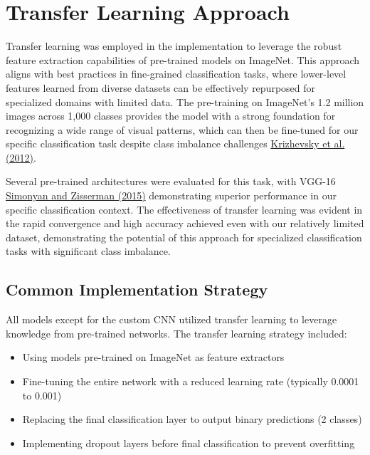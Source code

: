 \documentclass[a4paper,12pt]{article}
\begin{document}
\section{Transfer Learning Approach}

Transfer learning was employed in the implementation to leverage the robust feature extraction capabilities of pre-trained models on ImageNet. This approach aligns with best practices in fine-grained classification tasks, where lower-level features learned from diverse datasets can be effectively repurposed for specialized domains with limited data. The pre-training on ImageNet's 1.2 million images across 1,000 classes provides the model with a strong foundation for recognizing a wide range of visual patterns, which can then be fine-tuned for our specific classification task despite class imbalance challenges \href{https://proceedings.neurips.cc/paper/2012/file/c399862d3b9d6b76c8436e924a68c45b-Paper.pdf}{Krizhevsky et al. (2012)}.

Several pre-trained architectures were evaluated for this task, with VGG-16 \href{https://arxiv.org/abs/1409.1556}{Simonyan and Zisserman (2015)} demonstrating superior performance in our specific classification context. The effectiveness of transfer learning was evident in the rapid convergence and high accuracy achieved even with our relatively limited dataset, demonstrating the potential of this approach for specialized classification tasks with significant class imbalance.

\subsection{Common Implementation Strategy}

All models except for the custom CNN utilized transfer learning to leverage knowledge from pre-trained networks. The transfer learning strategy included:

\begin{itemize}
    \item Using models pre-trained on ImageNet as feature extractors
    \item Fine-tuning the entire network with a reduced learning rate (typically 0.0001 to 0.001)
    \item Replacing the final classification layer to output binary predictions (2 classes)
    \item Implementing dropout layers before final classification to prevent overfitting
\end{itemize}
\end{document}
